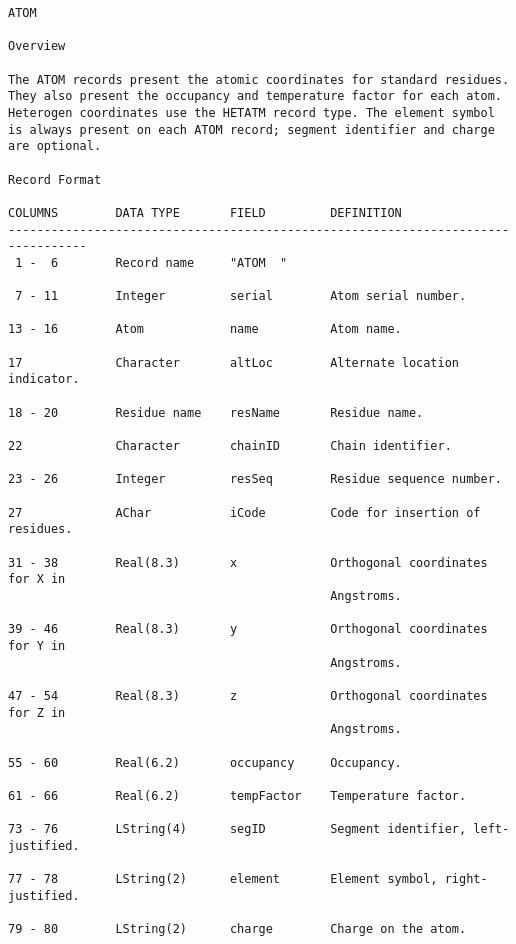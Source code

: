 \begin{lstlisting}
ATOM 

Overview 

The ATOM records present the atomic coordinates for standard residues.
They also present the occupancy and temperature factor for each atom.
Heterogen coordinates use the HETATM record type. The element symbol
is always present on each ATOM record; segment identifier and charge
are optional. 

Record Format 

COLUMNS        DATA TYPE       FIELD         DEFINITION                            
---------------------------------------------------------------------------------
 1 -  6        Record name     "ATOM  "                                            

 7 - 11        Integer         serial        Atom serial number.                   

13 - 16        Atom            name          Atom name.                            

17             Character       altLoc        Alternate location indicator.         

18 - 20        Residue name    resName       Residue name.                         

22             Character       chainID       Chain identifier.                     

23 - 26        Integer         resSeq        Residue sequence number.              

27             AChar           iCode         Code for insertion of residues.       

31 - 38        Real(8.3)       x             Orthogonal coordinates for X in       
                                             Angstroms.                       

39 - 46        Real(8.3)       y             Orthogonal coordinates for Y in       
                                             Angstroms.                            

47 - 54        Real(8.3)       z             Orthogonal coordinates for Z in       
                                             Angstroms.                            

55 - 60        Real(6.2)       occupancy     Occupancy.                            

61 - 66        Real(6.2)       tempFactor    Temperature factor.                   

73 - 76        LString(4)      segID         Segment identifier, left-justified.   

77 - 78        LString(2)      element       Element symbol, right-justified.      

79 - 80        LString(2)      charge        Charge on the atom.       
\end{lstlisting}

